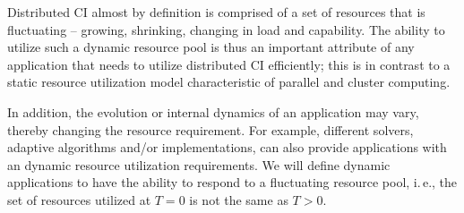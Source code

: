 \documentclass[conference,final]{IEEEtran}
\newcommand{\jhanote}[1]{ {\textcolor{red} { ***shantenu: #1 }}}
\newcommand{\alnote}[1]{ {\textcolor{blue} { ***andre: #1 }}}
\newcommand{\alnote}[1]{}
\newcommand{\jhanote}[1]{}
\begin{document}
Distributed CI almost by definition is comprised of a set of resources
that is fluctuating -- growing, shrinking, changing in load and
capability.  The ability to utilize such a dynamic resource pool is
thus an important attribute of any application that needs to utilize
distributed CI efficiently; this is in contrast to a static resource
utilization model characteristic of parallel and cluster computing.

In addition, the evolution or internal dynamics of an application may
vary, thereby changing the resource requirement.
For example, different solvers, %
adaptive algorithms and/or implementations, can also provide
applications with an dynamic resource utilization requirements.  We
will define dynamic applications to have the ability to respond to a
fluctuating resource pool, i.\,e., the set of resources utilized at
$T=0$ is not the same as $T>0$.








\end{document}
